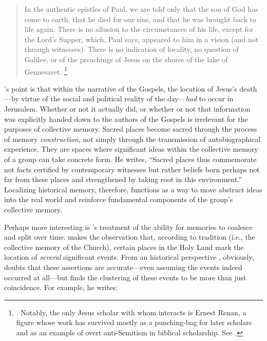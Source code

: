 \begin{quote}
    In the authentic epistles of Paul, we are told only that the son of God has come to earth, that he died for our sins, and that he was brought back to life again. There is no allusion to the circumstances of his life, except for the Lord's Supper, which, Paul says, appeared to him in a vision (and not through witnesses). There is no indication of locality, no question of Galilee, or of the preachings of Jesus on the shores of the lake of Gennesaret.%
        \footnote{%
            \Cite[209]{halbwachs1992}.
            Notably, the only Jesus scholar with whom \halbwachs interacts is Ernest Renan, a figure whose work has survived mostly as a punching-bag for later scholars and as an example of overt anti-Semitism in biblical scholarship. See 
            \cite[39]{heschel2008}.}
\end{quote}  
\noindent
\halbwachs's point is that within the narrative of the Gospels, the location of Jesus's death---by virtue of the social and political reality of the day---\emph{had} to occur in Jerusalem.%
    \autocite[211]{halbwachs1992}
Whether or not it actually did, or whether or not that information was explicitly handed down to the authors of the Gospels is irrelevant for the purposes of collective memory. Sacred places become sacred through the process of memory \emph{construction}, not simply through the transmission of autobiographical experience. They are spaces where significant ideas within the collective memory of a group can take concrete form. He writes, ``Sacred places thus commemorate not facts certified by contemporary witnesses but rather beliefs born perhaps not far from these places and strengthened by taking root in this environment.''%
    \autocite[199]{halbwachs1992}
Localizing historical memory, therefore, functions as a way to move abstract ideas into the real world and reinforce fundamental components of the group's collective memory.  

Perhaps more interesting is \halbwachs's treatment of the ability for memories to coalesce and split over time. \halbwachs makes the observation that, according to tradition (i.e., the collective memory of the Church), certain places in the Holy Land mark the location of \emph{several} significant events. From an historical perspective \halbwachs, obviously, doubts that these assertions are accurate---even assuming the events indeed occurred at all---but finds the clustering of these events to be more than just coincidence. For example, he writes:  

